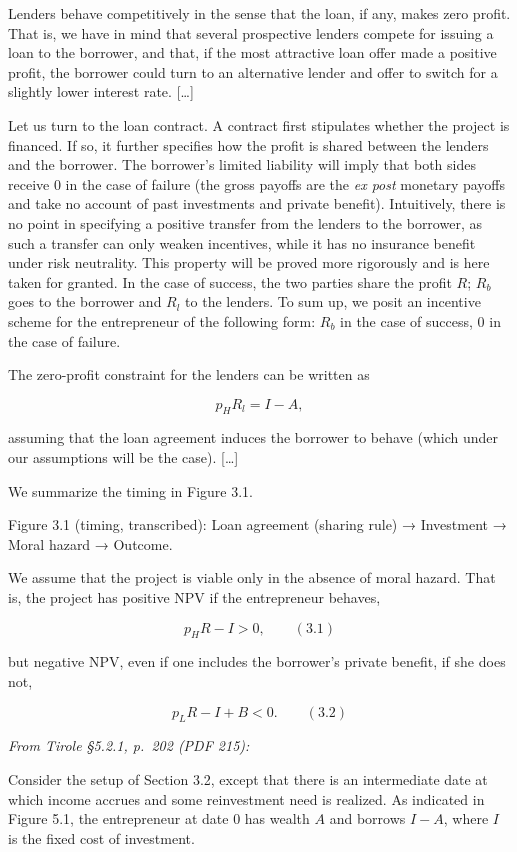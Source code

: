 \documentclass[11pt,a4paper]{article}
\begin{document}
Lenders behave competitively in the sense that the loan, if any, makes zero profit. That is, we have
in mind that several prospective lenders compete for issuing a loan to the borrower, and that, if
the most attractive loan offer made a positive profit, the borrower could turn to an alternative
lender and offer to switch for a slightly lower interest rate. {[}\ldots{]}

Let us turn to the loan contract. A contract first stipulates whether the project is financed. If
so, it further specifies how the profit is shared between the lenders and the borrower. The
borrower's limited liability will imply that both sides receive 0 in the case of failure (the gross
payoffs are the \emph{ex post} monetary payoffs and take no account of past investments and private
benefit). Intuitively, there is no point in specifying a positive transfer from the lenders to the
borrower, as such a transfer can only weaken incentives, while it has no insurance benefit under
risk neutrality. This property will be proved more rigorously and is here taken for granted. In the
case of success, the two parties share the profit \(R\); \(R_b\) goes to the borrower and \(R_l\) to
the lenders. To sum up, we posit an incentive scheme for the entrepreneur of the following form:
\(R_b\) in the case of success, 0 in the case of failure.

The zero-profit constraint for the lenders can be written as

\[p_HR_l = I - A,\]

assuming that the loan agreement induces the borrower to behave (which under our assumptions will be
the case). {[}\ldots{]}

We summarize the timing in Figure 3.1.

Figure 3.1 (timing, transcribed): Loan agreement (sharing rule) → Investment → Moral hazard →
Outcome.

We assume that the project is viable only in the absence of moral hazard. That is, the project has
positive NPV if the entrepreneur behaves,

\[p_HR - I > 0, \qquad (3.1)\]

but negative NPV, even if one includes the borrower's private benefit, if she does not,

\[p_LR - I + B < 0. \qquad (3.2)\]

\emph{From Tirole §5.2.1, p.~202 (PDF 215):}

Consider the setup of Section 3.2, except that there is an intermediate date at which income accrues
and some reinvestment need is realized. As indicated in Figure 5.1, the entrepreneur at date 0 has
wealth \(A\) and borrows \(I - A\), where \(I\) is the fixed cost of investment.
\end{document}
